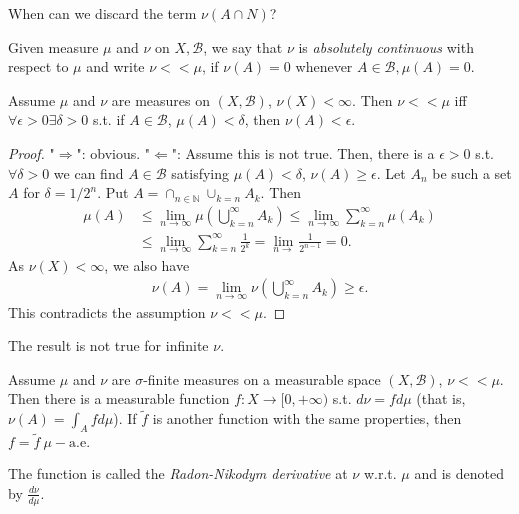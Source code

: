 When can we discard the term \(\nu(A\cap N)\)?
\begin{definition}
    Given measure \(\mu\) and \(\nu\) on \(X,\mathscr{B}\), we say that \(\nu\) is \emph{absolutely continuous} with respect to \(\mu\) and
    write \(\nu<<\mu\), if \(\nu(A)=0\) whenever \(A\in\mathscr{B}, \mu(A)=0\).
\end{definition}
\begin{lemma}
    Assume \(\mu\) and \(\nu\) are measures on \((X,\mathscr{B})\), \(\nu(X)<\infty\). Then \(\nu<<\mu\) iff 
    \(\forall \epsilon>0\exists\delta>0\) s.t. if \(A\in\mathscr{B}\), \(\mu(A)<\delta\), then \(\nu(A)<\epsilon\).
\end{lemma}
\ifdetailed
    \begin{proof}
        "\(\Rightarrow\)": obvious. "\(\Leftarrow\)": Assume this is not true. Then, there is a \(\epsilon>0\) s.t. \(\forall \delta>0\) we can
        find \(A\in\mathscr{B}\) satisfying \(\mu(A)<\delta\), \(\nu(A)\geq\epsilon\). Let \(A_n\) be such a set \(A\) for \(\delta=1/2^n\). Put
        \(A=\cap_{n\in\mathbb{N}}\cup_{k=n}A_k\). Then
        \begin{align*}
            \mu(A) &\leq \lim\limits_{n\rightarrow\infty}\mu\left(\bigcup_{k=n}^{\infty}A_k\right) 
            \leq \lim\limits_{n\rightarrow\infty}\sum\limits_{k=n}^{\infty}\mu(A_k) \\ 
            &\leq \lim\limits_{n\rightarrow\infty}\sum\limits_{k=n}^{\infty}\frac{1}{2^k} = \lim\limits_{n\rightarrow} \frac{1}{2^{n-1}} = 0.
        \end{align*}
        As \(\nu(X)<\infty\), we also have 
        \begin{align*}
            \nu(A) = \lim\limits_{n\rightarrow\infty}\nu\left(\bigcup_{k=n}^{\infty}A_k\right) \geq \epsilon.
        \end{align*}
        This contradicts the assumption \(\nu <<\mu\).
    \end{proof}
\fi
\begin{remark}
    The result is not true for infinite \(\nu\).
\end{remark}
\begin{theorem}
    Assume \(\mu\) and \(\nu\) are \(\sigma\)-finite measures on a measurable space \((X,\mathscr{B})\), \(\nu<<\mu\). Then there is a
    measurable function \(f:X\rightarrow [0,+\infty)\) s.t. \(d\nu=fd\mu\) (that is, \(\nu(A) = \int_Afd\mu\)). If \(\tilde{f}\) is
    another function with the same properties, then \(f=\tilde{f}\ \mu-\text{a.e.}\)

    The function is called the \emph{Radon-Nikodym derivative} at \(\nu\) w.r.t. \(\mu\) and is denoted by \(\frac{d\nu}{d\mu}\).
\end{theorem}
